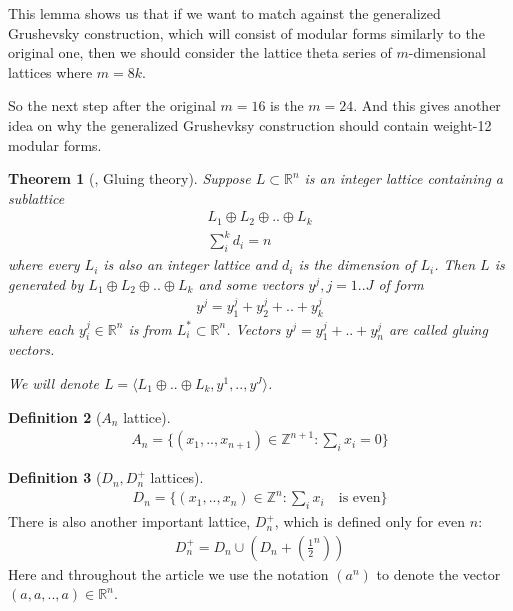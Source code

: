 \documentclass{article}
\newcommand{\ZZ}{\mathbb{Z}}
\newcommand{\RR}{\mathbb{R}}
\newcommand{\br}[1]{\left(#1\right)}
\theoremstyle{plain}
\newtheorem{theorem}{Theorem}[section]
\theoremstyle{definition}
\newtheorem{definition}[theorem]{Definition}
\begin{document}
This lemma shows us that if we want to match against the generalized Grushevsky construction,
which will consist of modular forms similarly to the original one,
then we should consider the lattice theta series of $m$-dimensional lattices where $m=8k$.

So the next step after the original $m=16$ is the $m=24$. And this gives another idea
on why the generalized Grushevksy construction should contain weight-12 modular forms.

\begin{theorem}[\cite{conway}, Gluing theory]\label{thm:gluing-theory}
    Suppose $L \subset \RR^n$ is an integer lattice containing a sublattice
    \begin{align}
        L_1 \oplus L_2 \oplus .. \oplus L_k \\
        \sum_i^k d_i=n
    \end{align}
    where every $L_i$ is also an integer lattice and $d_i$ is the dimension of $L_i$.
    Then $L$ is generated by $L_1 \oplus L_2 \oplus .. \oplus L_k$
    and some vectors $y^j, j=1..J$ of form
    \begin{align}
        y^j=y^j_1 + y^j_2 + .. + y^j_k
    \end{align}
    where each $y^j_i \in \RR^n$ is from $L_i^* \subset \RR^n$.
    Vectors $y^j=y^j_1+ ..+ y^j_n$ are called \emph{gluing vectors}.
    
    We will denote $L=\langle L_1 \oplus .. \oplus L_k, y^1, .., y^J \rangle$.
\end{theorem}

\begin{definition}[$A_n$ lattice]
    \begin{align}
        A_n = \{
            (x_1, .., x_{n+1}) \in \ZZ^{n+1}:
            \sum_i x_i = 0
        \}
    \end{align}
\end{definition}

\begin{definition}[$D_n, D_n^+$ lattices]
    \begin{align}
        D_n = \{
            (x_1, .., x_{n}) \in \ZZ^{n}:
            \sum_i x_i \quad \text{is even}
        \}
    \end{align}
    There is also another important lattice, $D_n^+$, which is defined only for even $n$:
    \begin{align}
        D_n^+ = D_n \cup \br{D_n + \br{\frac{1}{2}^n}}
    \end{align}
    Here and throughout the article 
    we use the notation $\br{a^n}$ to denote the vector $\br{a, a, .., a} \in \RR^n$.
\end{definition}
\end{document}

